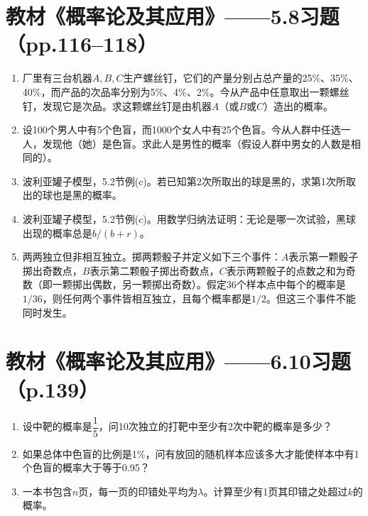 \documentclass[UTF8]{ctexart}
\begin{document}
\section*{教材《概率论及其应用》——5.8习题（pp.116--118）}

\begin{enumerate}
\renewcommand{\labelenumi}{\textbf{\arabic{enumi}.}}
\setcounter{enumi}{5}
\item 厂里有三台机器$A,B,C$生产螺丝钉，它们的产量分别占总产量的25\%、35\%、40\%，而产品的次品率分别为5\%、4\%、2\%。今从产品中任意取出一颗螺丝钉，发现它是次品。求这颗螺丝钉是由机器$A$（或$B$或$C$）造出的概率。

\setcounter{enumi}{6}
\item 设100个男人中有5个色盲，而1000个女人中有25个色盲。今从人群中任选一人，发现他（她）是色盲。求此人是男性的概率（假设人群中男女的人数是相同的）。

\setcounter{enumi}{17}
\item 波利亚罐子模型，5.2节例(c)。若已知第2次所取出的球是黑的，求第1次所取出的球也是黑的概率。

\setcounter{enumi}{18}
\item 波利亚罐子模型，5.2节例(c)。用数学归纳法证明：无论是哪一次试验，黑球出现的概率总是$b/(b+r)$。

\setcounter{enumi}{25}
\item 两两独立但非相互独立。掷两颗骰子并定义如下三个事件：$A$表示第一颗骰子掷出奇数点，$B$表示第二颗骰子掷出奇数点，$C$表示两颗骰子的点数之和为奇数（即一颗掷出偶数，另一颗掷出奇数）。假定36个样本点中每个的概率是$1/36$，则任何两个事件皆相互独立，且每个概率都是$1/2$。但这三个事件不能同时发生。
\end{enumerate}

\section*{教材《概率论及其应用》——6.10习题（p.139）}

\begin{enumerate}
\renewcommand{\labelenumi}{\textbf{\arabic{enumi}.}}
\setcounter{enumi}{4}
\item 设中靶的概率是$\dfrac{1}{5}$，问10次独立的打靶中至少有2次中靶的概率是多少？

\setcounter{enumi}{11}
\item 如果总体中色盲的比例是1\%，问有放回的随机样本应该多大才能使样本中有1个色盲的概率大于等于0.95？

\setcounter{enumi}{15}
\item 一本书包含$n$页，每一页的印错处平均为$\lambda$。计算至少有1页其印错之处超过$k$的概率。
\end{enumerate}
\end{document}
